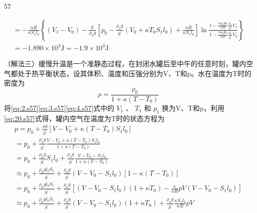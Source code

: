 \begin{solution}{57}
\begin{subsolution}
\begin{equation}
\begin{array}{l}
                = - \frac {n R}{\kappa S _ {1} l _ {0}} \left\{(V _ {1} - V _ {0}) - \frac {S^{\prime}}{\rho_{0} g} \left[ p _ {0} - \frac {\rho_{0} g}{S^{\prime}} (V _ {0} + \kappa T _ {0} S _ {1} l _ {0}) + \frac {n R}{\kappa S _ {1} l _ {0}} \right] \ln \frac {1 - \frac {\kappa \rho_{0} g l _ {0}}{n R} \frac {S _ {1}}{S^{\prime}} V _ {1}}{1 - \frac {\kappa \rho_{0} g l _ {0}}{n R} \frac {S _ {1}}{S^{\prime}} V _ {0}} \right\} \\
                = - 1.890 \times 10^{3} \mathrm{J} = - 1.9 \times 10^{3} \mathrm{J}
            \end{array}
            \label{eq:19.s57}
        \end{equation}

        （解法三）缓慢升温是一个准静态过程，在封闭水罐后至中午的任意时刻，罐内空气都处于热平衡状态，设其体积、温度和压强分别为V、T和p。水在温度为T时的密度为
        \begin{equation}
            \rho = \frac {\rho_{0}}{1 + \kappa (T - T _ {0})}
            \label{eq:20.s57}
        \end{equation}
        将\eqref{eq:2.s57}\eqref{eq:3.s57}\eqref{eq:4.s57}式中的 $V_{1}$ 、 $T_{1}$ 和 $p_{1}$ 换为V、T和p，利用\eqref{eq:20.s57}式得，罐内空气在温度为T时的状态方程为
        \begin{equation}
            \begin{array}{l}
                p = p _ {0} + \frac {\rho g}{S^{\prime}} \left[ V - V _ {0} + \kappa (T - T _ {0}) S _ {1} l _ {0} \right] \\
                = p _ {0} + \frac {\rho_{0} g}{S^{\prime}} \frac {V - V _ {0} + \kappa (T - T _ {0}) S _ {1} l _ {0}}{1 + \kappa (T - T _ {0})} \\
                = p _ {0} + \frac {\rho_{0} g}{S^{\prime}} S _ {1} l _ {0} + \frac {\rho_{0} g}{S^{\prime}} \frac {V - V _ {0} - S _ {1} l _ {0}}{1 + \kappa (T - T _ {0})} \\
                \approx p _ {0} + \frac {\rho_{0} g l _ {0} S _ {1}}{S^{\prime}} + \frac {\rho_{0} g}{S^{\prime}} (V - V _ {0} - S _ {1} l _ {0}) [ 1 - \kappa (T - T _ {0}) ] \\
                = p _ {0} + \frac {\rho_{0} g l _ {0} S _ {1}}{S^{\prime}} + \frac {\rho_{0} g}{S^{\prime}} \left[ (V - V _ {0} - S _ {1} l _ {0}) (1 + \kappa T _ {0}) - \frac {\kappa}{n R} p V (V - V _ {0} - S _ {1} l _ {0}) \right] \\
                \approx p _ {0} + \frac {\rho_{0} g l _ {0} S _ {1}}{S^{\prime}} + \frac {\rho_{0} g}{S^{\prime}} (V - V _ {0} - S _ {1} l _ {0}) (1 + \kappa T _ {0}) + \frac {\rho_{0} g}{S^{\prime}} \frac {\kappa S _ {1} l _ {0}}{n R} p V \\

\end{array}
\end{equation}
\end{subsolution}
\end{solution}
